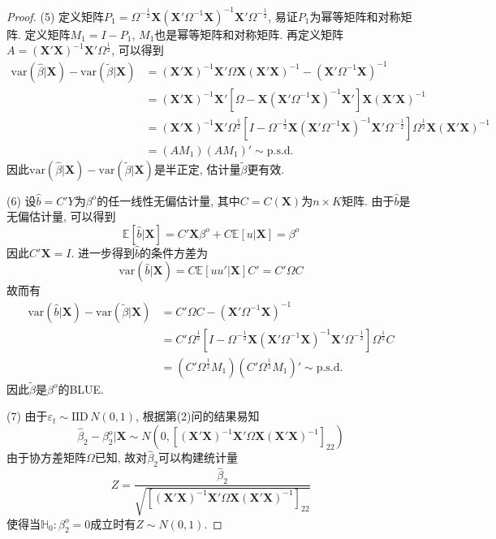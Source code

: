 \documentclass[cn,12pt,math=mtpro2,citestyle=gb7714-2015,bibstyle=gb7714-2015,twocol,mode=simple]{elegantbook}
\newcommand{\E}{\mathbb{E}}
\newcommand{\var}{\text{var}}
\newcommand{\hbeta}{\hat{\beta}}
\newcommand{\tbeta}{\tilde{\beta}}
\begin{document}
\begin{proof}
  (5) 定义矩阵$P_1=\Omega^{-\frac{1}{2}}\mathbf{X}(\mathbf{X}'\Omega^{-1}\mathbf{X})^{-1}\mathbf{X}'\Omega^{-\frac{1}{2}}$, 易证$P_1$为幂等矩阵和对称矩阵. 定义矩阵$M_1=I-P_1$, $M_1$也是幂等矩阵和对称矩阵. 再定义矩阵$A=(\mathbf{X}'\mathbf{X})^{-1}\mathbf{X}'\Omega^{\frac{1}{2}}$, 可以得到
  \begin{align*}
  \var(\hbeta|\mathbf{X})-\var(\tbeta|\mathbf{X})&=(\mathbf{X}'\mathbf{X})^{-1}\mathbf{X}'\Omega \mathbf{X}(\mathbf{X}'\mathbf{X})^{-1}-(\mathbf{X}'\Omega^{-1}\mathbf{X})^{-1} \\
  &=(\mathbf{X}'\mathbf{X})^{-1}\mathbf{X}'[\Omega-\mathbf{X}(\mathbf{X}'\Omega^{-1}\mathbf{X})^{-1}\mathbf{X}']\mathbf{X}(\mathbf{X}'\mathbf{X})^{-1} \\
  &=(\mathbf{X}'\mathbf{X})^{-1}\mathbf{X}'\Omega^{\frac{1}{2}}[I-\Omega^{-\frac{1}{2}}\mathbf{X}(\mathbf{X}'\Omega^{-1}\mathbf{X})^{-1}\mathbf{X}'\Omega^{-\frac{1}{2}}]\Omega^{\frac{1}{2}}\mathbf{X}(\mathbf{X}'\mathbf{X})^{-1} \\
  &= (AM_1)(AM_1)' \sim \text{p.s.d.}
  \end{align*}
  因此$\var(\hbeta|\mathbf{X})-\var(\tbeta|\mathbf{X})$是半正定, 估计量$\tbeta$更有效.

  (6) 设$\hat{b}=C'Y$为$\beta^o$的任一线性无偏估计量, 其中$C=C(\mathbf{X})$为$n \times K$矩阵. 由于$\hat{b}$是无偏估计量, 可以得到
  $$\E[\hat{b}|\mathbf{X}]=C'\mathbf{X}\beta^o+C\E[u|\mathbf{X}]=\beta^o$$
  因此$C'\mathbf{X}=I$. 进一步得到$\hat{b}$的条件方差为
  $$\var(\hat{b}|\mathbf{X})=C\E[uu'|\mathbf{X}]C'=C'\Omega C$$
  故而有
  \begin{align*}
 \var(\hat{b}|\mathbf{X})-\var(\tbeta|\mathbf{X})&=C'\Omega C-(\mathbf{X}'\Omega^{-1}\mathbf{X})^{-1} \\
 &=C'\Omega^{\frac{1}{2}}[I-\Omega^{-\frac{1}{2}}\mathbf{X}(\mathbf{X}'\Omega^{-1}\mathbf{X})^{-1}\mathbf{X}'\Omega^{-\frac{1}{2}}]\Omega^{\frac{1}{2}}C \\
 &=(C'\Omega^{\frac{1}{2}}M_1)(C'\Omega^{\frac{1}{2}}M_1)' \sim \text{p.s.d.}
  \end{align*}
  因此$\tbeta$是$\beta^o$的BLUE.

  (7) 由于$\varepsilon_t \sim \text{IID}\,N(0, 1)$, 根据第(2)问的结果易知
   $$\hbeta_2-\beta_2^o|\mathbf{X} \sim N(0, [(\mathbf{X}'\mathbf{X})^{-1}\mathbf{X}'\Omega \mathbf{X}(\mathbf{X}'\mathbf{X})^{-1}]_{22})$$
   由于协方差矩阵$\Omega$已知, 故对$\hbeta_2$可以构建统计量
   $$Z=\frac{\hbeta_2}{\sqrt{[(\mathbf{X}'\mathbf{X})^{-1}\mathbf{X}'\Omega \mathbf{X}(\mathbf{X}'\mathbf{X})^{-1}]_{22}}}$$
   使得当$\mathbb{H}_0: \beta_2^o=0$成立时有$Z\sim N(0,1)$.


\end{proof}
\end{document}
